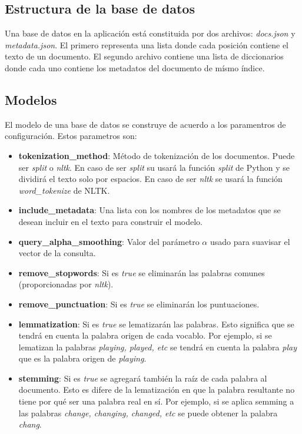\subsection{Estructura de la base de datos}\label{sec:build-database}

Una base de datos en la aplicación está constituida por dos archivos:
\emph{docs.json} y \emph{metadata.json}. El primero representa
una lista donde cada posición contiene el texto de un documento. El
segundo archivo contiene una lista de diccionarios donde cada uno
contiene los metadatos del documento de mísmo índice.

\subsection{Modelos}\label{sec:model}

El modelo de una base de datos se construye de acuerdo a los paramentros de
configuración. Estos parametros son:

\begin{itemize}
	\item \textbf{tokenization\_method}: Método de tokenización de los
		documentos. Puede ser \emph{split} o \emph{nltk}. En caso de ser
		\emph{split} su usará la función \emph{split} de Python y se
		dividirá el texto solo por espacios. En caso de ser \emph{nltk} se
		usará la función \emph{word\_tokenize} de NLTK.
	\item \textbf{include\_metadata}: Una lista con los nombres de los
		metadatos que se desean incluir en el texto para construir el modelo.
	\item \textbf{query\_alpha\_smoothing}: Valor del parámetro $\alpha$ usado
		para suavisar el vector de la consulta.
	\item \textbf{remove\_stopwords}: Si es \emph{true} se eliminarán las
		palabras comunes (proporcionadas por \emph{nltk}).
	\item \textbf{remove\_punctuation}: Si es \emph{true} se eliminarán los
		puntuaciones.
	\item \textbf{lemmatization}: Si es \emph{true} se lematizarán las
		palabras. Esto significa que se tendrá en cuenta la palabra origen de
		cada vocablo. Por ejemplo, si se lematizan la palabras \emph{playing,
		played, etc} se tendrá en cuenta la palabra \emph{play} que es la
		palabra origen de \emph{playing}.
	\item \textbf{stemming}: Si es \emph{true} se agregará también la raíz de
		cada palabra al documento. Esto es difere de la lematización en que
		la palabra resultante no tiene por qué ser una palabra real en sí. Por
		ejemplo, si se aplica semming a las palabras \emph{change, changing,
		changed, etc} se puede obtener la palabra \emph{chang}.
\end{itemize}

